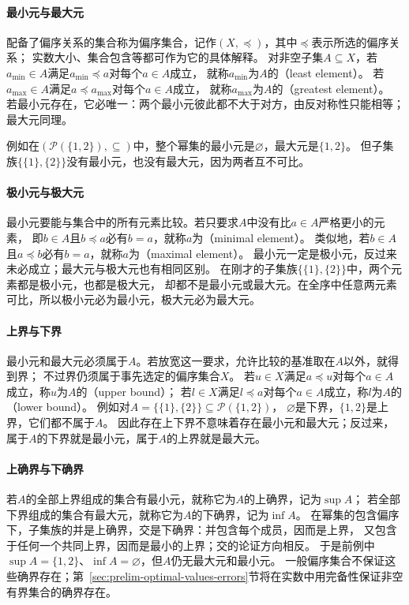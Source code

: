 \paragraph{最小元与最大元}
配备了偏序关系的集合称为偏序集合，记作$(X,\preceq)$，其中$\preceq$表示所选的偏序关系；
实数大小、集合包含等都可作为它的具体解释。
对非空子集$A\subseteq X$，若$a_{\min}\in A$满足$a_{\min}\preceq a$对每个$a\in A$成立，
就称$a_{\min}$为$A$的（least element）。
若$a_{\max}\in A$满足$a\preceq a_{\max}$对每个$a\in A$成立，
就称$a_{\max}$为$A$的（greatest element）。
若最小元存在，它必唯一：两个最小元彼此都不大于对方，由反对称性只能相等；最大元同理。

例如在$(\mathcal P(\{1,2\}),\subseteq)$中，整个幂集的最小元是$\varnothing$，最大元是$\{1,2\}$。
但子集族$\{\{1\},\{2\}\}$没有最小元，也没有最大元，因为两者互不可比。

\paragraph{极小元与极大元}
最小元要能与集合中的所有元素比较。若只要求$A$中没有比$a\in A$严格更小的元素，
即$b\in A$且$b\preceq a$必有$b=a$，就称$a$为（minimal element）。
类似地，若$b\in A$且$a\preceq b$必有$b=a$，就称$a$为（maximal element）。
最小元一定是极小元，反过来未必成立；最大元与极大元也有相同区别。
在刚才的子集族$\{\{1\},\{2\}\}$中，两个元素都是极小元，也都是极大元，
却都不是最小元或最大元。在全序中任意两元素可比，所以极小元必为最小元，极大元必为最大元。

\paragraph{上界与下界}
最小元和最大元必须属于$A$。若放宽这一要求，允许比较的基准取在$A$以外，就得到界；
不过界仍须属于事先选定的偏序集合$X$。
若$u\in X$满足$a\preceq u$对每个$a\in A$成立，称$u$为$A$的（upper bound）；
若$l\in X$满足$l\preceq a$对每个$a\in A$成立，称$l$为$A$的（lower bound）。
例如对$A=\{\{1\},\{2\}\}\subseteq\mathcal P(\{1,2\})$，
$\varnothing$是下界，$\{1,2\}$是上界，它们都不属于$A$。
因此存在上下界不意味着存在最小元和最大元；反过来，属于$A$的下界就是最小元，属于$A$的上界就是最大元。

\paragraph{上确界与下确界}
若$A$的全部上界组成的集合有最小元，就称它为$A$的上确界，记为$\sup A$；
若全部下界组成的集合有最大元，就称它为$A$的下确界，记为$\inf A$。
在幂集的包含偏序下，子集族的并是上确界，交是下确界：并包含每个成员，因而是上界，
又包含于任何一个共同上界，因而是最小的上界；交的论证方向相反。
于是前例中$\sup A=\{1,2\}$、$\inf A=\varnothing$，但$A$仍无最大元和最小元。
一般偏序集合不保证这些确界存在；第~\ref{sec:prelim-optimal-values-errors}节将在实数中用完备性保证非空有界集合的确界存在。

